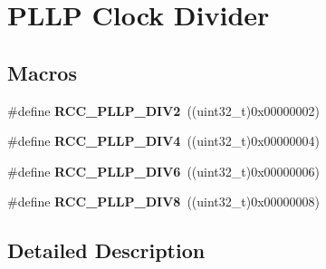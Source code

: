 \hypertarget{group___r_c_c___p_l_l_p___clock___divider}{}\section{P\+L\+LP Clock Divider}
\label{group___r_c_c___p_l_l_p___clock___divider}
\subsection*{Macros}
\begin{DoxyCompactItemize}
\item 
\#define {\bfseries R\+C\+C\+\_\+\+P\+L\+L\+P\+\_\+\+D\+I\+V2}~((uint32\+\_\+t)0x00000002)\hypertarget{group___r_c_c___p_l_l_p___clock___divider_ga16248cbd581f020b8a8d1cf0d9f0864d}{}\label{group___r_c_c___p_l_l_p___clock___divider_ga16248cbd581f020b8a8d1cf0d9f0864d}

\item 
\#define {\bfseries R\+C\+C\+\_\+\+P\+L\+L\+P\+\_\+\+D\+I\+V4}~((uint32\+\_\+t)0x00000004)\hypertarget{group___r_c_c___p_l_l_p___clock___divider_ga91b2c03c1f205addc5f52a1e740f801a}{}\label{group___r_c_c___p_l_l_p___clock___divider_ga91b2c03c1f205addc5f52a1e740f801a}

\item 
\#define {\bfseries R\+C\+C\+\_\+\+P\+L\+L\+P\+\_\+\+D\+I\+V6}~((uint32\+\_\+t)0x00000006)\hypertarget{group___r_c_c___p_l_l_p___clock___divider_ga5ad6be8ec0a6efaa1c81fbd29017a1fa}{}\label{group___r_c_c___p_l_l_p___clock___divider_ga5ad6be8ec0a6efaa1c81fbd29017a1fa}

\item 
\#define {\bfseries R\+C\+C\+\_\+\+P\+L\+L\+P\+\_\+\+D\+I\+V8}~((uint32\+\_\+t)0x00000008)\hypertarget{group___r_c_c___p_l_l_p___clock___divider_gaab7662734bfff248c5dad97ea5f6736e}{}\label{group___r_c_c___p_l_l_p___clock___divider_gaab7662734bfff248c5dad97ea5f6736e}

\end{DoxyCompactItemize}


\subsection{Detailed Description}
